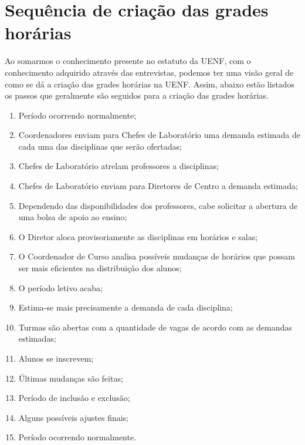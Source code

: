 \section{Sequência de criação das grades horárias} %


Ao somarmos o conhecimento presente no estatuto da UENF, com o conhecimento adquirido através das entrevistas, podemos ter uma visão geral de como se dá a criação das grades horárias na UENF. Assim, abaixo estão listados os passos que geralmente são seguidos para a criação das grades horárias.


\begin{enumerate}
  \item Período ocorrendo normalmente;
  \item Coordenadores enviam para Chefes de Laboratório uma demanda estimada de cada uma das disciplinas que serão ofertadas;
  \item Chefes de Laboratório atrelam professores a disciplinas;
  \item Chefes de Laboratório enviam para Diretores de Centro a demanda estimada;
  \item Dependendo das disponibilidades dos professores, cabe solicitar a abertura de uma bolsa de apoio ao ensino;
  \item O Diretor aloca provisoriamente as disciplinas em horários e salas;
  \item O Coordenador de Curso analisa possíveis mudanças de horários que possam ser mais eficientes na distribuição dos alunos;
  \item O período letivo acaba;
  \item Estima-se mais precisamente a demanda de cada disciplina;
  \item Turmas são abertas com a quantidade de vagas de acordo com as demandas estimadas;
  \item Alunos se inscrevem;
  \item Últimas mudanças são feitas;
  \item Período de inclusão e exclusão;
  \item Alguns possíveis ajustes finais;
  \item Período ocorrendo normalmente.
\end{enumerate}

